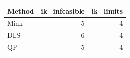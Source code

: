 \begin{tabular}{lrr}
\toprule
Method & ik\_infeasible & ik\_limits\\
\midrule
Mink & 5 & 4\\
DLS & 6 & 4\\
QP & 5 & 4\\
\bottomrule
\end{tabular}
